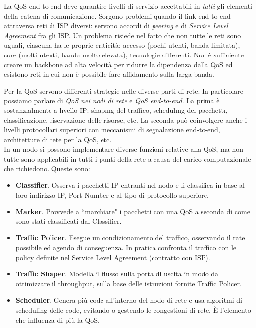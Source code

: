 La QoS end-to-end deve garantire livelli di servizio accettabili in \textit{tutti} gli elementi della catena di comunicazione. Sorgono problemi quando il link end-to-end attraversa reti di ISP diversi: servono accordi di \textit{peering} e di \textit{Service Level Agreement} fra gli ISP. Un problema risiede nel fatto che non tutte le reti sono uguali, ciascuna ha le proprie criticità: accesso (pochi utenti, banda limitata), core (molti utenti, banda molto elevata), tecnologie differenti. Non è sufficiente creare un backbone ad alta velocità per ridurre la dipendenza dalla QoS ed esistono reti in cui non è possibile fare affidamento sulla larga banda.

Per la QoS servono differenti strategie nelle diverse parti di rete. In particolare possiamo parlare di \textit{QoS nei nodi di rete} e \textit{QoS end-to-end}. La prima è sostanzialmente a livello IP: shaping del traffico, scheduling dei pacchetti, classificazione, riservazione delle risorse, etc. La seconda può coinvolgere anche i livelli protocollari superiori con meccanismi di segnalazione end-to-end, architetture di rete per la QoS, etc.\\
In un nodo si possono implementare diverse funzioni relative alla QoS, ma non tutte sono applicabili in tutti i punti della rete a causa del carico computazionale che richiedono. Queste sono:
\begin{itemize}
	\item \textbf{Classifier}. Osserva i pacchetti IP entranti nel nodo e li classifica in base al loro indirizzo IP, Port Number e al tipo di protocollo superiore.
	\item \textbf{Marker}. Provvede a \textquotedblleft marchiare" i pacchetti con una QoS a seconda di come sono stati classificati dal Classifier.
	\item \textbf{Traffic Policer}. Esegue un condizionamento del traffico, osservando il rate possibile ed agendo di conseguenza. In pratica confronta il traffico con le policy definite nel Service Level Agreement (contratto con ISP).
	\item \textbf{Traffic Shaper}. Modella il flusso sulla porta di uscita in modo da ottimizzare il throughput, sulla base delle istruzioni fornite Traffic Policer.
	\item \textbf{Scheduler}. Genera più code all'interno del nodo di rete e usa algoritmi di scheduling delle code, evitando o gestendo le congestioni di rete. È l'elemento che influenza di più la QoS.
\end{itemize}
